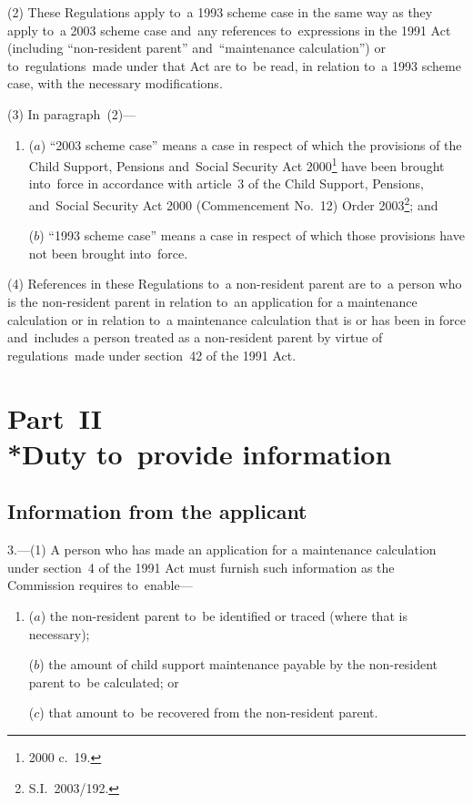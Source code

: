 \documentclass[12pt,a4paper]{article}
\begin{document}
(2) These Regulations apply to~a 1993 scheme case in the same way as they apply to~a 2003 scheme case and~any references to~expressions in the 1991 Act (including “non-resident parent” and~“maintenance calculation”) or to~regulations~made under that Act are to~be read, in relation to~a 1993 scheme case, with the necessary modifications.

(3) In paragraph~(2)—
\begin{enumerate}\item[]
($a$) “2003 scheme case” means a case in respect of which the provisions of the Child Support, Pensions and~Social Security Act 2000\footnote{2000 c.~19.} have been brought into~force in accordance with article~3 of the Child Support, Pensions, and~Social Security Act 2000 (Commencement No.~12) Order 2003\footnote{S.I.~2003/192.}; and

($b$) “1993 scheme case” means a case in respect of which those provisions have not been brought into~force.
\end{enumerate}

(4) References in these Regulations to~a non-resident parent are to~a person who is the non-resident parent in relation to~an application for a maintenance calculation or in relation to~a maintenance calculation that is or has been in force and~includes a person treated as a non-resident parent by virtue of regulations~made under section~42 of the 1991 Act.

\section[Part~II --- Duty to~provide information]{Part~II\\*Duty to~provide information}

\renewcommand\parthead{--- Part~II}

\subsection[3. Information from the applicant]{Information from the applicant}

3.---(1)  A person who has made an application for a maintenance calculation under section~4 of the 1991 Act must furnish such information as the Commission requires to~enable—
\begin{enumerate}\item[]
($a$) the non-resident parent to~be identified or traced (where that is necessary);

($b$) the amount of child support maintenance payable by the non-resident parent to~be calculated; or

($c$) that amount to~be recovered from the non-resident parent.
\end{enumerate}
\end{document}
